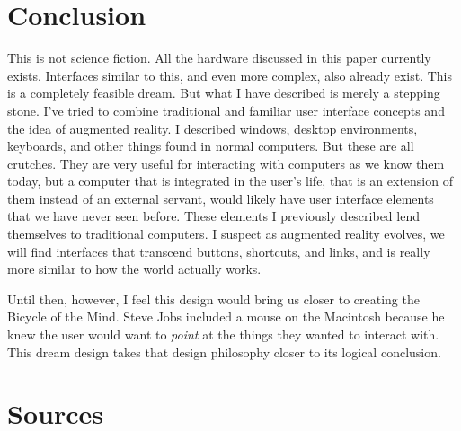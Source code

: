 \documentclass[a4paper,12pt]{article}
\begin{document}
\section{Conclusion}

This is not science fiction. All the hardware discussed in this paper currently exists. Interfaces similar to this, and even more complex, also already exist. This is a completely feasible dream. But what I have described is merely a stepping stone. I've tried to combine traditional and familiar user interface concepts and the idea of augmented reality. I described windows, desktop environments, keyboards, and other things found in normal computers. But these are all crutches. They are very useful for interacting with computers as we know them today, but a computer that is integrated in the user's life, that is an extension of them instead of an external servant, would likely have user interface elements that we have never seen before. These elements I previously described lend themselves to traditional computers. I suspect as augmented reality evolves, we will find interfaces that transcend buttons, shortcuts, and links, and is really more similar to how the world actually works.

Until then, however, I feel this design would bring us closer to creating the Bicycle of the Mind. Steve Jobs included a mouse on the Macintosh because he knew the user would want to \emph{point} at the things they wanted to interact with. This dream design takes that design philosophy closer to its logical conclusion. 

\section{Sources}
\end{document}

